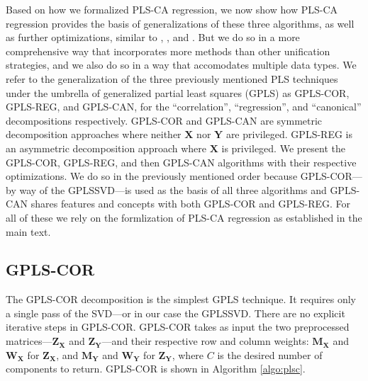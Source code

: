 \documentclass[12pt]{article}
\begin{document}
Based on how we formalized PLS-CA regression, we now show how PLS-CA
regression provides the basis of generalizations of these three
algorithms, as well as further optimizations, similar to
\citet{borga_unified_1992}, \citet{indahl2009canonical}, and
\citet{de2019pls}. But we do so in a more comprehensive way that
incorporates more methods than other unification strategies, and we also
do so in a way that accomodates multiple data types. We refer to the
generalization of the three previously mentioned PLS techniques under
the umbrella of generalized partial least squares (GPLS) as GPLS-COR,
GPLS-REG, and GPLS-CAN, for the ``correlation'', ``regression'', and
``canonical'' decompositions respectively. GPLS-COR and GPLS-CAN are
symmetric decomposition approaches where neither \({\mathbf X}\) nor
\({\mathbf Y}\) are privileged. GPLS-REG is an asymmetric decomposition
approach where \({\mathbf X}\) is privileged. We present the GPLS-COR,
GPLS-REG, and then GPLS-CAN algorithms with their respective
optimizations. We do so in the previously mentioned order because
GPLS-COR---by way of the GPLSSVD---is used as the basis of all three
algorithms and GPLS-CAN shares features and concepts with both GPLS-COR
and GPLS-REG. For all of these we rely on the formlization of PLS-CA
regression as established in the main text.

\hypertarget{gpls-cor}{%
\subsection{GPLS-COR}\label{gpls-cor}}

The GPLS-COR decomposition is the simplest GPLS technique. It requires
only a single pass of the SVD---or in our case the GPLSSVD. There are no
explicit iterative steps in GPLS-COR. GPLS-COR takes as input the two
preprocessed matrices---\({\mathbf Z}_{\mathbf X}\) and
\({\mathbf Z}_{\mathbf Y}\)---and their respective row and column
weights: \({\mathbf M}_{\mathbf X}\) and \({\mathbf W}_{\mathbf X}\) for
\({\mathbf Z}_{\mathbf X}\), and \({\mathbf M}_{\mathbf Y}\) and
\({\mathbf W}_{\mathbf Y}\) for \({\mathbf Z}_{\mathbf Y}\), where \(C\)
is the desired number of components to return. GPLS-COR is shown in
Algorithm \ref{algo:plsc}.
\end{document}
